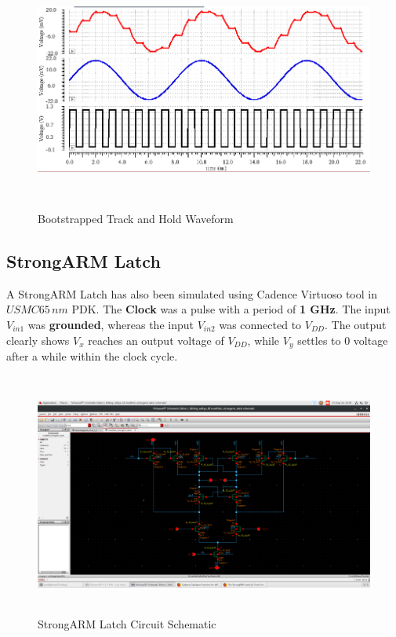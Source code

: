 \begin{figure}[h]
	\centering
	\includegraphics[width=16cm,height=8cm]{fig4_4.png}
	\caption{Bootstrapped Track and Hold Waveform}
	\label{t_h_waveform}
\end{figure}

\subsection{StrongARM Latch}

A StrongARM Latch has also been simulated using Cadence Virtuoso tool in $USMC\! 65 \, nm$ PDK. The \textbf{Clock} was a pulse with a period of \textbf{1 GHz}. The input \textbf{$V_{in1}$} was \textbf{grounded}, whereas the input \textbf{$V_{in2}$} was connected to \textbf{$V_{DD}$}. The output clearly shows \textbf{$V_{x}$} reaches an output voltage of \textbf{$V_{DD}$}, while \textbf{$V_{y}$} settles to 0 voltage after a while within the clock cycle. 

\begin{figure}[h]
	\centering
	\includegraphics[width=16cm,height=8cm]{fig4_5.png}
	\caption{StrongARM Latch Circuit Schematic}
	\label{comp_ckt}
\end{figure}

